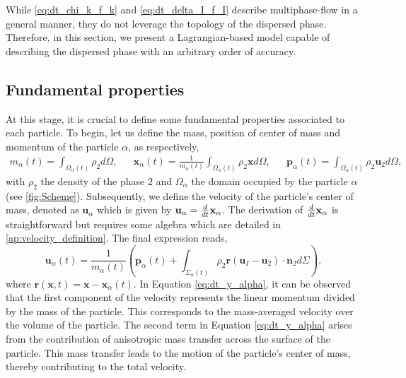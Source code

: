 
While \ref{eq:dt_chi_k_f_k} and \ref{eq:dt_delta_I_f_I} describe multiphase-flow in a general manner, they do not leverage the topology of the dispersed phase. 
Therefore, in this section, we present a Lagrangian-based model capable of describing the dispersed phase with an arbitrary order of accuracy.

\subsection{Fundamental properties}

At this stage, it is crucial to define some fundamental properties associated to each particle.
To begin, let us define the mass, position of center of mass and momentum of the particle $\alpha$, as respectively,
\begin{align}
    m_\alpha(t)
    = \int_{\Omega_\alpha(t)} \rho_2  d\Omega,
    &&
    \textbf{x}_\alpha(t)
    = \frac{1}{m_\alpha(t) }\int_{\Omega_\alpha(t)} \rho_2 \textbf{x} d\Omega,
    &&
    \textbf{p}_\alpha(t) 
    = \int_{\Omega_\alpha(t)} \rho_2 \textbf{u}_2 d\Omega,
    \label{eq:position_and_momentum_def}
\end{align}
with $\rho_2$ the density of the phase $2$ and $\Omega_\alpha$ the domain occupied by the particle $\alpha$ (see \ref{fig:Scheme}). 
Subsequently, we define the velocity of the particle's center of mass, denoted as $\textbf{u}_\alpha$ which is given by $\textbf{u}_\alpha = \frac{d}{d t} \textbf{x}_\alpha$. 
The derivation of $\frac{d}{d t} \textbf{x}_\alpha$ is straightforward but requires some algebra which are detailed in \ref{ap:velocity_definition}. 
The final expression reads,
\begin{equation}
    \textbf{u}_\alpha(t) = \frac{1}{m_\alpha(t)} \left(
        \textbf{p}_\alpha(t)
        +  \int_{\Sigma_\alpha(t)} \rho_2 \textbf{r} (\textbf{u}_I - \textbf{u}_2)\cdot \textbf{n}_2 d\Sigma
        \right),
        \label{eq:dt_y_alpha}
\end{equation}
where $\textbf{r}(\textbf{x},t) = \textbf{x} - \textbf{x}_\alpha(t)$. 
In Equation \ref{eq:dt_y_alpha}, it can be observed that the first component of the velocity represents the linear momentum divided by the mass of the particle. 
This corresponds to the mass-averaged velocity over the volume of the particle.
The second term in Equation \ref{eq:dt_y_alpha} arises from the contribution of anisotropic mass transfer across the surface of the particle. 
This mass transfer leads to the motion of the particle's center of mass, thereby contributing to the total velocity.
